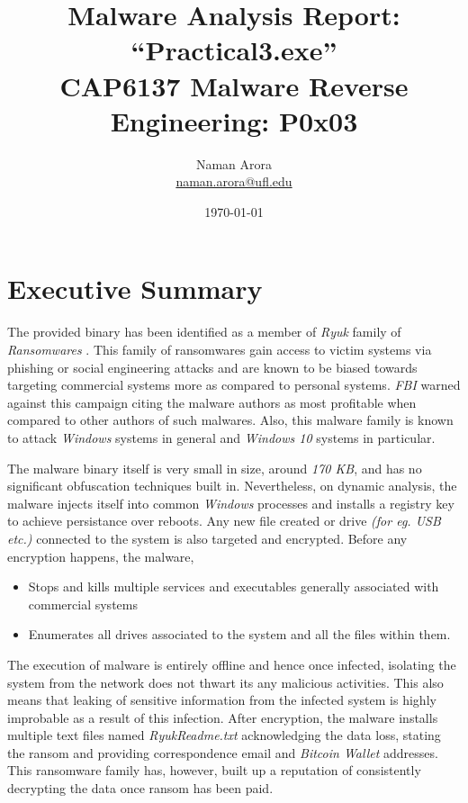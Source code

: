 \documentclass[10pt,a4paper]{article}
\begin{document}

\title{Malware Analysis Report: ``Practical3.exe''\\ \vspace{-8pt} {\large CAP6137 Malware Reverse Engineering: P0x03}}
\author{{Naman Arora \\ \vspace{-10pt}\small \href{mailto:naman.arora@ufl.edu}{naman.arora@ufl.edu}}}
\date{\today}

\maketitle
\newpage
\tableofcontents
\newpage
\section{Executive Summary}
The provided binary has been identified as a member of \textit{Ryuk} family of \textit{Ransomwares} \cite{ransomware}.
This family of ransomwares gain access to victim systems via phishing \cite{phishing} or social engineering attacks \cite{socialEngg} and are known to be biased towards targeting commercial systems more as compared to personal systems.
\textit{FBI} warned against this campaign citing the malware authors as most profitable when compared to other authors of such malwares.
Also, this malware family is known to attack \textit{Windows} systems in general and \textit{Windows 10} systems in particular.

The malware binary itself is very small in size, around \textit{170 KB}, and has no significant obfuscation techniques built in.
Nevertheless, on dynamic analysis, the malware injects itself into common \textit{Windows} processes and installs a registry key to achieve persistance over reboots.
Any new file created or drive \textit{(for eg. USB etc.)} connected to the system is also targeted and encrypted.
Before any encryption happens, the malware,
\begin{itemize}
	\vspace{-1em}
	\item Stops and kills multiple services and executables generally associated with commercial systems
	\item Enumerates all drives associated to the system and all the files within them.
\end{itemize}

The execution of malware is entirely offline and hence once infected, isolating the system from the network does not thwart its any malicious activities.
This also means that leaking of sensitive information from the infected system is highly improbable as a result of this infection.
After encryption, the malware installs multiple text files named \textit{RyukReadme.txt} acknowledging the data loss, stating the ransom and providing correspondence email and \textit{Bitcoin Wallet} addresses.
This ransomware family has, however, built up a reputation of consistently decrypting the data once ransom has been paid.
\end{document}
